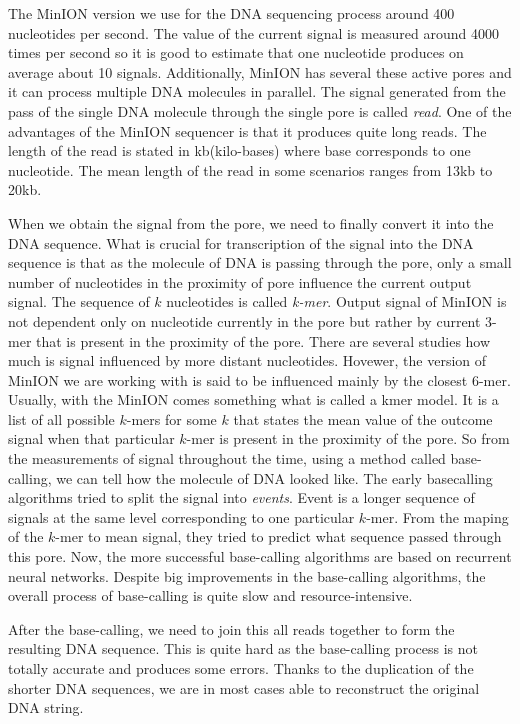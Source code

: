 The MinION version we use for the DNA sequencing process around 400 nucleotides per second.
The value of the current signal is measured around 4000 times per second so it is good to
estimate that one nucleotide produces on average about 10 signals. Additionally,
MinION has several these active pores and it can process multiple DNA molecules in
parallel. The signal generated from the pass of the single DNA molecule through
the single pore is called \textit{read}. One of the advantages of the MinION sequencer is
that it produces quite long reads. The length of the read is stated in kb(kilo-bases)
where base corresponds to one nucleotide. The mean length of the read in some
scenarios ranges from 13kb to 20kb.


When we obtain the signal from the pore, we need to finally convert it into the DNA
sequence. What is crucial for transcription of the signal into the DNA sequence is
that as the molecule of DNA is passing through the pore, only a small
number of nucleotides in the proximity of pore influence the current output signal.
The sequence of $k$ nucleotides is called \textit{k-mer}. Output signal of MinION
is not dependent only on nucleotide currently in the pore but rather by current
3-mer that is present in the proximity of the pore. There are several studies
how much is signal influenced by more distant nucleotides. Hovewer, the version
of MinION we are working with is said to be influenced mainly by the closest 6-mer. 
Usually, with the MinION comes something what is called a kmer model. It is a list of all possible $k$-mers
for some $k$ that states the mean value of the outcome signal when that particular
$k$-mer is present in the proximity of the pore. So from the measurements of signal
throughout the time, using a method called base-calling, we can tell how the molecule
of DNA looked like. The early basecalling algorithms tried to split the signal into
\textit{events}. Event is a longer sequence of signals at the same level corresponding
to one particular $k$-mer. From the maping of the $k$-mer to mean signal, they tried
to predict what sequence passed through this pore. Now, the more successful base-calling
algorithms are based on recurrent neural networks. Despite big improvements in the
base-calling algorithms, the overall process of base-calling is quite slow and resource-intensive. 

After the base-calling, we need to join this all reads together to form the
resulting DNA sequence. This is quite hard as the base-calling process is not totally
accurate and produces some errors. Thanks to the duplication of the shorter DNA
sequences, we are in most cases able to reconstruct the original DNA string.

